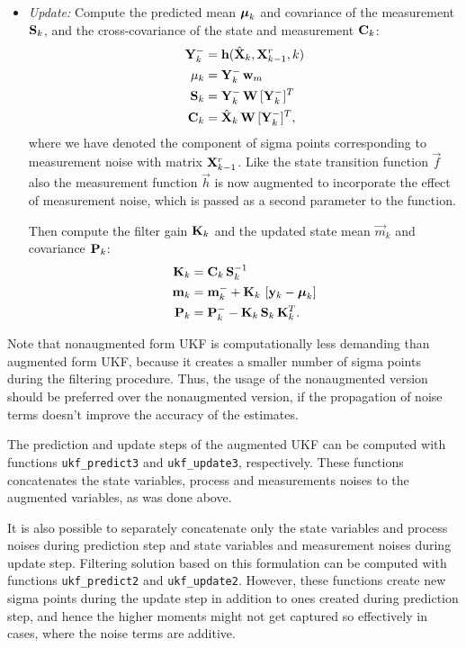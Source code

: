 \begin{itemize}
%
\item {\em Update:} Compute the predicted mean $\boldsymbol{\mu}_k$ and
covariance of the measurement $\mathbf{S}_k$, and the cross-covariance of
the state and measurement $\mathbf{C}_k$:
%
\begin{equation}
\begin{split} \mathbf{Y}^-_k &=
\mathbf{h}(\hat{\mathbf{X}}_k,\mathbf{X}^r_{k-1},k) \\ \mathbf{\mu}_k &=
\mathbf{Y}^-_k \, \mathbf{w}_m \\ \mathbf{S}_k &= \mathbf{Y}^-_k \, \mathbf{W} \,
[\mathbf{Y}^-_k]^T \\ \mathbf{C}_k &= \hat{\mathbf{X}}_k \, \mathbf{W} \,
[\mathbf{Y}^-_k]^T,
\end{split}
\label{eq:ukf2_update1}
\end{equation}
%
where we have denoted the component of sigma points corresponding to
measurement noise with matrix $\mathbf{X}^r_{k-1}$. Like the state
transition function $\vec{f}$ also the measurement function $\vec{h}$
is now augmented to incorporate the effect of measurement noise, which
is passed as a second parameter to the function.

Then compute the filter gain $\mathbf{K}_k$ and the updated state mean
$\vec{m}_k$ and covariance $\mathbf{P}_k$:
%
\begin{equation}
\begin{split} \mathbf{K}_k &= \mathbf{C}_k \, \mathbf{S}_k^{-1} \\ \mathbf{m}_k &=
\mathbf{m}^-_k + \mathbf{K}_k \, \left[ \mathbf{y}_k - \boldsymbol{\mu}_k \right] \\
\mathbf{P}_k &= \mathbf{P}^-_k - \mathbf{K}_k \, \mathbf{S}_k \, \mathbf{K}_k^T.
\end{split}
\label{eq:ukf2_update2}
\end{equation}
\end{itemize}
%

Note that nonaugmented form UKF is computationally less demanding than
augmented form UKF, because it creates a smaller number of sigma
points during the filtering procedure. Thus, the usage of the
nonaugmented version should be preferred over the nonaugmented
version, if the propagation of noise terms doesn't improve the
accuracy of the estimates.

The prediction and update steps of the augmented UKF can be computed
with functions \texttt{ukf\_predict3} and \texttt{ukf\_update3},
respectively. These functions concatenates the state variables,
process and measurements noises to the augmented variables, as was
done above.

It is also possible to separately concatenate only the state variables
and process noises during prediction step and state variables and
measurement noises during update step. Filtering solution based on
this formulation can be computed with functions \texttt{ukf\_predict2}
and \texttt{ukf\_update2}. However, these functions create new sigma
points during the update step in addition to ones created during
prediction step, and hence the higher moments might not get captured
so effectively in cases, where the noise terms are additive.


